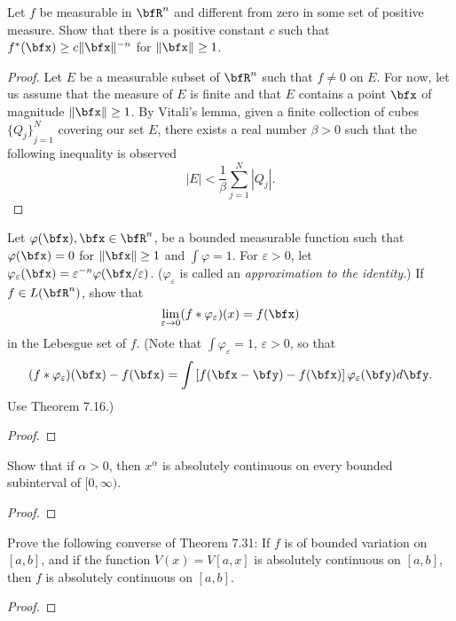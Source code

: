 
\begin{problem}
Let $f$ be measurable in $\bfR^n$ and different from zero in some set of
positive measure. Show that there is a positive constant $c$ such that
$f^*(\bfx)\geq c\|\bfx\|^{-n}$ for $\|\bfx\|\geq 1$.
\end{problem}
\begin{proof}
Let $E$ be a measurable subset of $\bfR^n$ such that $f\neq 0$ on $E$. For
now, let us assume that the measure of $E$ is finite and that $E$ contains
a point $\bfx$ of magnitude $\|\bfx\|\geq 1$. By Vitali's lemma, given a
finite collection of cubes ${\{Q_j\}}_{j=1}^N$ covering our set $E$, there
exists a real number $\beta>0$ such that the following inequality is
observed
\begin{equation}
\label{eq:10:vitalis-covering-lemma}
|E|<\frac{1}{\beta}\sum_{j=1}^N|Q_j|.
\end{equation}
\end{proof}
\newpage

\begin{problem}
Let $\varphi(\bfx),\bfx\in\bfR^n$, be a bounded measurable function such
that $\varphi(\bfx)=0$ for $\|\bfx\|\geq 1$ and $\int\varphi=1$. For
$\varepsilon>0$, let
$\varphi_\varepsilon(\bfx)=\varepsilon^{-n}\varphi(\bfx/\varepsilon)$. ($\varphi_\varepsilon$
is called an \emph{approximation to the identity}.) If $f\in L(\bfR^n)$,
show that
\[
\lim_{\varepsilon\to 0}(f*\varphi_\varepsilon)(x)=f(\bfx)
\]
in the Lebesgue set of $f$. (Note that $\int\varphi_\varepsilon=1$,
$\varepsilon>0$, so that
\[
(f*\varphi_\varepsilon)(\bfx)-f(\bfx)=\int\left[f(\bfx-\bfy)-f(\bfx)\right]\varphi_\varepsilon(\bfy)d\bfy.
\]
Use Theorem 7.16.)
\end{problem}
\begin{proof}
\end{proof}
\newpage

\begin{problem}
Show that if $\alpha>0$, then $x^\alpha$ is absolutely continuous on every
bounded subinterval of $[0,\infty)$.
\end{problem}
\begin{proof}
\end{proof}
\newpage


\begin{problem}
Prove the following converse of Theorem 7.31: If $f$ is of bounded
variation on $[a,b]$, and if the function $V(x)=V[a,x]$ is absolutely
continuous on $[a,b]$, then $f$ is absolutely continuous on $[a,b]$.
\end{problem}
\begin{proof}
\end{proof}
\newpage

